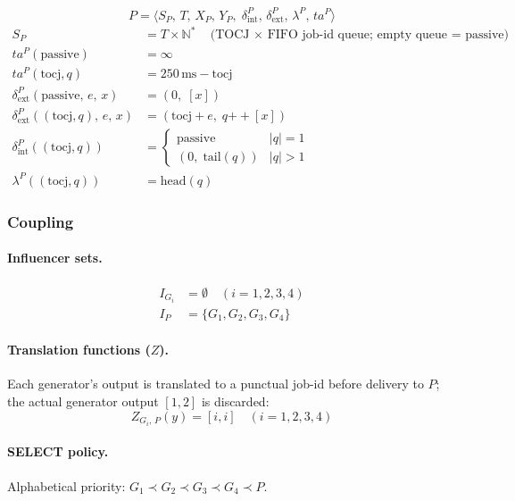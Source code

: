 \[
  P = \langle S_P,\, T,\, X_P,\, Y_P,\;
      \delta^P_{\text{int}},\, \delta^P_{\text{ext}},\,
      \lambda^P,\, ta^P \rangle
\]
\begin{align*}
  S_P &= T \times \mathbb{N}^*
    \quad\text{(TOCJ $\times$ FIFO job-id queue; empty queue = passive)}\\
  ta^P(\text{passive})  &= \infty \\
  ta^P(\text{tocj}, q)  &= 250\,\text{ms} - \text{tocj} \\
  \delta^P_{\text{ext}}\!\left(\text{passive},\, e,\, x\right)
    &= (0,\; [x]) \\
  \delta^P_{\text{ext}}\!\left((\text{tocj}, q),\, e,\, x\right)
    &= (\text{tocj} + e,\; q \mathbin{+\!\!+} [x]) \\
  \delta^P_{\text{int}}((\text{tocj}, q))
    &= \begin{cases}
         \text{passive}        & |q| = 1 \\
         (0,\; \text{tail}(q)) & |q| > 1
       \end{cases} \\
  \lambda^P((\text{tocj}, q)) &= \text{head}(q)
\end{align*}

\subsubsection*{Coupling}

\paragraph{Influencer sets.}
\begin{align*}
  I_{G_i} &= \emptyset \quad (i = 1,2,3,4) \\
  I_P     &= \{G_1, G_2, G_3, G_4\}
\end{align*}

\paragraph{Translation functions ($Z$).}
Each generator's output is translated to a punctual job-id before
delivery to $P$; the actual generator output $[1,2]$ is discarded:
\[
  Z_{G_i,\,P}(y) = [i, i] \quad (i = 1,2,3,4)
\]

\paragraph{SELECT policy.}
Alphabetical priority: $G_1 \prec G_2 \prec G_3 \prec G_4 \prec P$.

